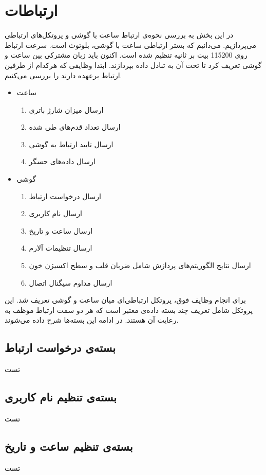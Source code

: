\section{ارتباطات} \label{sec:comm}
در این بخش به بررسی نحوه‌ی ارتباط ساعت با گوشی و پروتکل‌های ارتباطی می‌پردازیم. می‌دانیم که بستر ارتباطی ساعت با گوشی، بلوتوث است. سرعت ارتباط روی 115200 بیت بر ثانیه تنظیم شده است. اکنون باید زبان مشترکی بین ساعت و گوشی تعریف کرد تا تحت آن به تبادل داده بپردازند. ابتدا وظایفی که هرکدام از طرفین ارتباط برعهده دارند را بررسی می‌کنیم.
\begin{itemize}
	\item ساعت
	\begin{enumerate}
		\item ارسال میزان شارژ باتری
		\item ارسال تعداد قدم‌های طی شده
		\item ارسال تایید ارتباط به گوشی
		\item ارسال داده‌های حسگر 
	\end{enumerate}
	\item گوشی
	\begin{enumerate}
		\item ارسال درخواست ارتباط
		\item ارسال نام کاربری
		\item ارسال ساعت و تاریخ
		\item ارسال تنظیمات آلارم
		\item ارسال نتایج الگوریتم‌های پردازش  شامل ضربان قلب و سطح اکسیژن خون
		\item ارسال مداوم سیگنال اتصال
	\end{enumerate}	
\end{itemize}

\newpage
برای انجام وظایف فوق، پروتکل ارتباطی‌ای میان ساعت و گوشی تعریف شد. این پروتکل شامل تعریف چند بسته داده‌ی معتبر است که هر دو سمت ارتباط موظف به رعایت آن هستند. در ادامه این بسته‌ها شرح داده می‌شوند.

\subsection{بسته‌ی درخواست ارتباط}
تست

\subsection{بسته‌ی تنظیم نام کاربری}
تست

\subsection{بسته‌ی تنظیم ساعت و تاریخ}
تست

